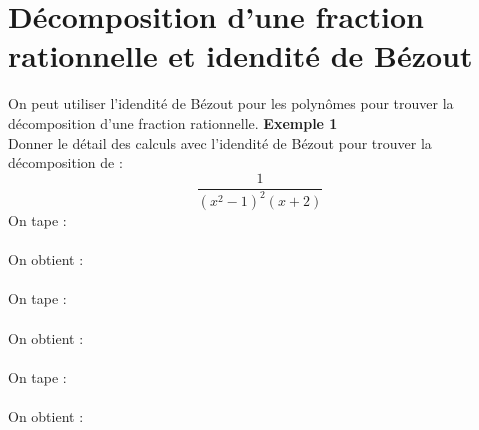\documentclass[a4paper,11pt]{book}
\begin{document}
\section{D\'ecomposition d'une fraction rationnelle et idendit\'e de B\'ezout}
On peut utiliser l'idendit\'e de B\'ezout pour les polyn\^omes pour trouver la
d\'ecomposition d'une fraction rationnelle.
{\bf Exemple 1}\\
Donner le d\'etail des calculs avec l'idendit\'e de B\'ezout pour trouver la 
d\'ecomposition de :$$\frac{1}{(x^2-1)^2(x+2)}$$
On tape :\\
{\tt }\\
On obtient :\\
{\tt }\\
On tape :\\
{\tt }\\
On obtient :\\
{\tt }\\
On tape :\\
{\tt }\\
On obtient :\\
{\tt }\\
\end{document}
